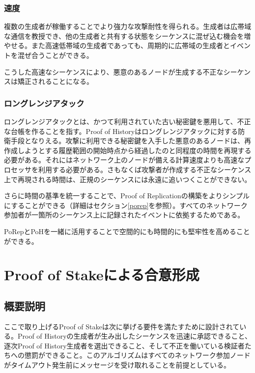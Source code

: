 \documentclass[12pt]{ltjsarticle}
\begin{document}
\subsubsection{速度}
複数の生成者が稼働することでより強力な攻撃耐性を得られる。生成者は広帯域な通信を教授でき、他の生成者と共有する状態をシーケンスに混ぜ込む機会を増やせる。また高速低帯域の生成者であっても、周期的に広帯域の生成者とイベントを混ぜ合うことができる。

こうした高速なシーケンスにより、悪意のあるノードが生成する不正なシーケンスは矯正されることになる。

\subsubsection{ロングレンジアタック}

ロングレンジアタックとは、かつて利用されていた古い秘密鍵を悪用して、不正な台帳を作ることを指す\cite{casper}。Proof of Historyはロングレンジアタックに対する防衛手段となりえる。攻撃に利用できる秘密鍵を入手した悪意のあるノードは、再作成しようとする履歴範囲の開始時点から経過したのと同程度の時間を再現する必要がある。それにはネットワーク上のノードが備える計算速度よりも高速なプロセッサを利用する必要がある。さもなくば攻撃者が作成する不正なシーケンス上で再現される時間は、正規のシーケンスには永遠に追いつくことができない。

さらに時間の基準を統一することで、Proof of Replicationの構築をよりシンプルにすることができる（詳細はセクション\ref{porep}を参照）。すべてのネットワーク参加者が一箇所のシーケンス上に記録されたイベントに依拠するためである。

PoRepとPoHを一緒に活用することで空間的にも時間的にも堅牢性を高めることができる。

\section{Proof of Stakeによる合意形成}\label{proof_of_stake}
\subsection{概要説明}
ここで取り上げるProof of Stakeは次に挙げる要件を満たすために設計されている。Proof of Historyの生成者が生み出したシーケンスを迅速に承認できること、逐次Proof of History生成者を選出できること、そして不正を働いている検証者たちへの懲罰ができること。このアルゴリズムはすべてのネットワーク参加ノードがタイムアウト発生前にメッセージを受け取れることを前提としている。
\end{document}
